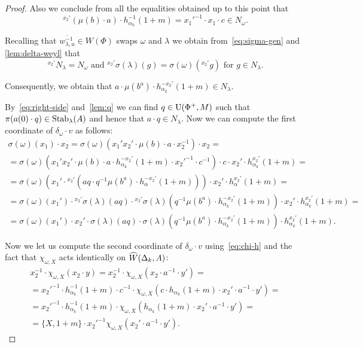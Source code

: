 \begin{proof}
 Also we conclude from all the equalities obtained up to this point that
 \begin{equation} {}^{x_2'}(\mu(b) \cdot a) \cdot h_{\alpha_k}^{-1}(1+m) = {x_1'}^{-1} \cdot x_1 \cdot c \in N_\omega. \end{equation}

 Recalling that $\overline{w_{\lambda, u}^{-1}} \in W(\Phi)$ swaps $\omega$ and $\lambda$
  we obtain from~\eqref{eq:sigma-gen} and \cref{lem:delta-weyl} that
 \begin{equation} \label{eq:delta-weyl-x2prime} {}^{x_2'}N_\lambda = N_\omega\text{ and } {}^{x_2'}\sigma(\lambda)(g) = \sigma(\omega)({}^{x_2'}g)\text{ for } g\in N_\lambda.\end{equation}

 Consequently, we obtain that
  $a \cdot \mu(b^a) \cdot h_{\alpha_k}^{-{x_2'}}(1+m) \in {N_{\lambda}}$.

 By~\eqref{eq:right-side} and~\cref{lem:q} we can find $q \in \operatorname{U}(\Phi^+, M)$ such that $\pi(a(0) \cdot q) \in \operatorname{Stab}_\lambda(A)$ and hence
     that $a \cdot q \in N_\lambda$.
 Now we can compute the first coordinate of $\delta_\omega \cdot v$ as follows:
 \begin{multline} \label{eq:intermediate}
  \sigma(\omega)(x_1) \cdot x_2 = \sigma(\omega)(x_1'x_2' \cdot \mu(b) \cdot a \cdot x_2^{-1}) \cdot x_2 = \\
   = \sigma(\omega)(x_1'x_2' \cdot \mu(b) \cdot a \cdot h^{-{x_2'}}_{\alpha_k}(1+m) \cdot {x_2'}^{-1} \cdot c^{-1}) \cdot c \cdot x_2' \cdot h_{\alpha_k}^{x_2'}(1+m) = \\
   = \sigma(\omega)\left(x_1'\cdot {}^{x_2'} (aq \cdot q^{-1} \mu(b^a) \cdot h^{-x_2'}_\alpha(1+m))\right) \cdot x_2' \cdot h_{\alpha}^{x_2'}(1+m) = \\
   = \sigma(\omega)(x_1') \cdot {}^{x_2'}\sigma(\lambda)(aq) \cdot {}^{x_2'}\sigma(\lambda)(q^{-1} \mu(b^a) \cdot h^{-x_2'}_{\alpha_k}(1+m)) \cdot x_2' \cdot h^{x_2'}_{\alpha_k}(1+m) = \\
   = \sigma(\omega)(x_1') \cdot x_2' \cdot \sigma(\lambda)(aq) \cdot \sigma(\lambda)\left(q^{-1} \mu(b^a) \cdot h^{-x_2'}_{\alpha_k}(1+m)\right) \cdot h^{x_2'}_{\alpha_k}(1+m).
 \end{multline}

 Now we let us compute the second coordinate of $\delta_\omega \cdot v$ using~\eqref{eq:chi-h} and the fact that
 $\chi_{\omega, X}$ acts identically on $\widehat{W}(\Delta_k, A)$:
 \begin{multline}\label{eq:intermediate2}
 x_2^{-1}\cdot \chi_{\omega, X}(x_2 \cdot y) = x_2^{-1} \cdot \chi_{\omega, X}(x_2 \cdot a^{-1} \cdot y') = \\
 = {x_2'}^{-1} \cdot h_{\alpha_k}^{-1}(1 + m) \cdot c^{-1} \cdot \chi_{\omega, X}(c \cdot h_{\alpha_k}(1 + m) \cdot x_2' \cdot a^{-1} \cdot y') = \\
 = {x_2'}^{-1} \cdot h_{\alpha_k}^{-1}(1 + m) \cdot \chi_{\omega, X}(h_{\alpha_k}(1 + m) \cdot x_2' \cdot a^{-1} \cdot y') = \\
 = \{X, 1+m\} \cdot {x_2'}^{-1} \chi_{\omega, X}(x_2' \cdot a^{-1} \cdot y').
 \end{multline}


\end{proof}
